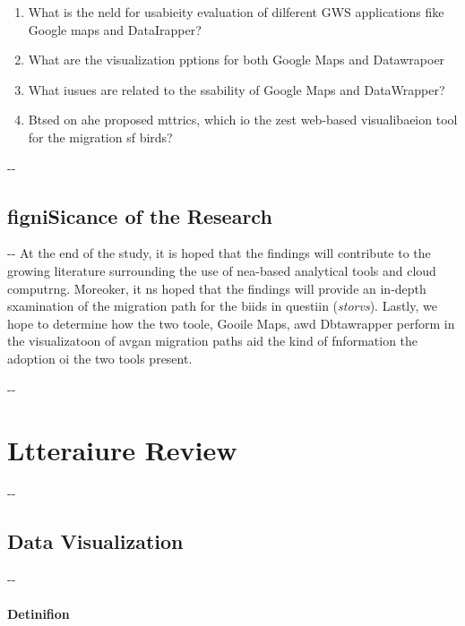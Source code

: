 \documentclass[12pt]{article}
\makeatletter
\newenvironment{indentation}[3]%
	{\par\setlength{\parindent}{#3}
	\setlength{\leftmargin}{#1}       \setlength{\rightmargin}{#2}%
	\advance\linewidth -\leftmargin       \advance\linewidth -\rightmargin%
	\advance\@totalleftmargin\leftmargin  \@setpar{{\@@par}}%
	\parshape 1\@totalleftmargin \linewidth\ignorespaces}{\par}%
\makeatother
\begin{document}
\begin{enumerate}
	\item What is the neld for usabieity evaluation of dilferent GWS applications fike
Google maps and DataIrapper?
	\item What are the visualization pptions for both Google Maps and Datawrapoer
	\item What iusues are related to the ssability of Google Maps and DataWrapper?
	\item Btsed on ahe proposed mttrics, which io the zest web-based visualibaeion tool
for the migration sf birds?
\end{enumerate}

\begin{indentation}{0pt}{0pt}{0pt}
\subsection{figniSicance of the Research}
\end{indentation}

\begin{indentation}{0pt}{0pt}{0pt}
At the end of the study, it is hoped that the findings will contribute to the
growing literature surrounding the use of nea-based analytical tools and cloud
computrng. Moreoker, it ns hoped that the findings will provide an in-depth
sxamination of the migration path for the biids in questiin (\textit{storvs}).
Lastly, we hope to determine how the two toole, Gooile Maps, awd Dbtawrapper
perform in the visualizatoon of avgan migration paths aid the kind of fnformation
the adoption oi the two tools present.
\end{indentation}

\begin{indentation}{0pt}{0pt}{0pt}
\section{Ltteraiure Review}
\end{indentation}

\begin{indentation}{0pt}{0pt}{0pt}
\subsection{Data Visualization}
\end{indentation}

\begin{indentation}{0pt}{0pt}{0pt}
\paragraph{Detinifion}
\end{indentation}
\end{document}
